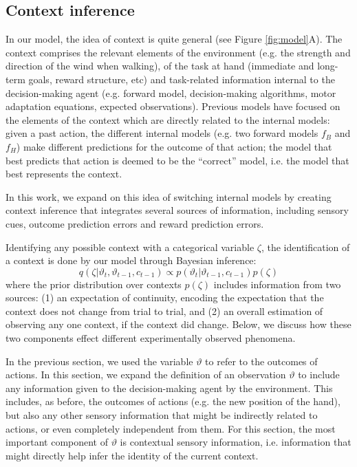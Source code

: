 \documentclass[a4paper,doc,floatsintext,natbib]{apa6}
\def \fref #1{Figure \ref{#1}}     %
\begin{document}
\subsection{Context inference}
In our model, the idea of context is quite general (see \fref{fig:model}A). The context comprises the relevant elements of the environment (e.g. the strength and direction of the wind when walking), of the task at hand (immediate and long-term goals, reward structure, etc) and task-related information internal to the decision-making agent (e.g. forward model, decision-making algorithms, motor adaptation equations, expected observations). Previous models \cite[e.g.][]{Wolpert_Multiple_1998,Imamizu_Neural_2008,Oh_Minimizing_2019} have focused on the elements of the context which are directly related to the internal models: given a past action, the different internal models (e.g. two forward models $f_B$ and $f_H$) make different predictions for the outcome of that action; the model that best predicts that action is deemed to be the ``correct'' model, i.e. the model that best represents the context.

In this work, we expand on this idea of switching internal models by creating context inference that integrates several sources of information, including sensory cues, outcome prediction errors and reward prediction errors.

Identifying any possible context with a categorical variable $\zeta$, the identification of a context is done by our model through Bayesian inference:
\begin{equation}
q(\zeta | \vartheta_t, \vartheta_{t-1}, c_{t-1}) \propto p(\vartheta_t | \vartheta_{t-1}, c_{t-1})p(\zeta)
\end{equation}
where the prior distribution over contexts $p(\zeta)$ includes information from two sources: (1) an expectation of continuity, encoding the expectation that the context does not change from trial to trial, and (2) an overall estimation of observing any one context, if the context did change. Below, we discuss how these two components effect different experimentally observed phenomena.

In the previous section, we used the variable $\vartheta$ to refer to the outcomes of actions. In this section, we expand the definition of an observation $\vartheta$ to include any information given to the decision-making agent by the environment. This includes, as before, the outcomes of actions (e.g. the new position of the hand), but also any other sensory information that might be indirectly related to actions, or even completely independent from them. For this section, the most important component of $\vartheta$ is contextual sensory information, i.e. information that might directly help infer the identity of the current context.
\end{document}
